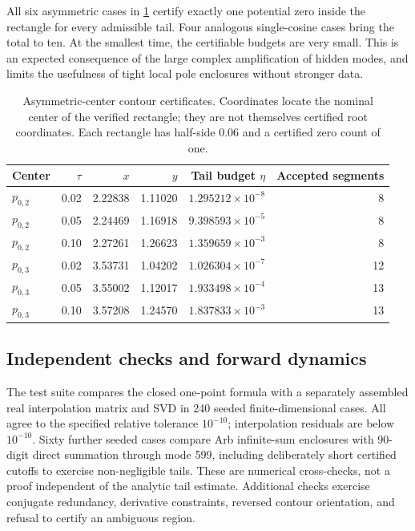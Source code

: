 \documentclass[11pt]{article}
\begin{document}
All six asymmetric cases in \cref{tab:contours} certify exactly one potential zero inside the rectangle for every admissible tail. Four analogous single-cosine cases bring the total to ten. At the smallest time, the certifiable budgets are very small. This is an expected consequence of the large complex amplification of hidden modes, and limits the usefulness of tight local pole enclosures without stronger data.

\begin{table}[t]
\centering\small
\caption{Asymmetric-center contour certificates. Coordinates locate the nominal center of the verified rectangle; they are not themselves certified root coordinates. Each rectangle has half-side $0.06$ and a certified zero count of one.}\label{tab:contours}
\begin{tabular}{@{}lrrrrr@{}}\toprule
Center & $\tau$ & $x$ & $y$ & Tail budget $\eta$ & Accepted segments\\\midrule
$p_{0,2}$ & 0.02 & 2.22838 & 1.11020 & $1.295212\times10^{-8}$ & 8\\
$p_{0,2}$ & 0.05 & 2.24469 & 1.16918 & $9.398593\times10^{-5}$ & 8\\
$p_{0,2}$ & 0.10 & 2.27261 & 1.26623 & $1.359659\times10^{-3}$ & 8\\
$p_{0,3}$ & 0.02 & 3.53731 & 1.04202 & $1.026304\times10^{-7}$ & 12\\
$p_{0,3}$ & 0.05 & 3.55002 & 1.12017 & $1.933498\times10^{-4}$ & 13\\
$p_{0,3}$ & 0.10 & 3.57208 & 1.24570 & $1.837833\times10^{-3}$ & 13\\\bottomrule
\end{tabular}
\end{table}

\subsection{Independent checks and forward dynamics}
The test suite compares the closed one-point formula with a separately assembled real interpolation matrix and SVD in 240 seeded finite-dimensional cases. All agree to the specified relative tolerance $10^{-10}$; interpolation residuals are below $10^{-10}$. Sixty further seeded cases compare Arb infinite-sum enclosures with 90-digit direct summation through mode 599, including deliberately short certified cutoffs to exercise non-negligible tails. These are numerical cross-checks, not a proof independent of the analytic tail estimate. Additional checks exercise conjugate redundancy, derivative constraints, reversed contour orientation, and refusal to certify an ambiguous region.
\end{document}
